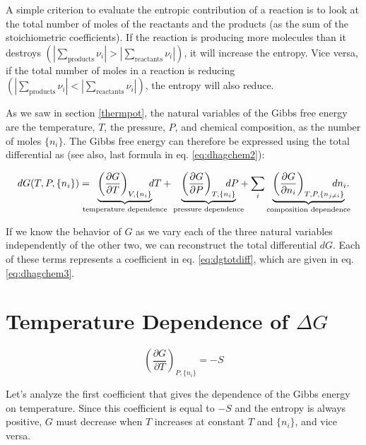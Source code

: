 \documentclass[
  9pt,
]{extbook}
\theoremstyle{definition}
\theoremstyle{definition}
\theoremstyle{definition}
\theoremstyle{remark}
\begin{document}
A simple criterion to evaluate the entropic contribution of a reaction is to look at the total number of moles of the reactants and the products (as the sum of the stoichiometric coefficients). If the reaction is producing more molecules than it destroys \(\left( \left| \sum_\text{products} \nu_i \right| > \left| \sum_\text{reactants} \nu_i \right| \right)\), it will increase the entropy. Vice versa, if the total number of moles in a reaction is reducing \(\left( \left| \sum_\text{products} \nu_i \right| < \left| \sum_\text{reactants} \nu_i \right| \right)\), the entropy will also reduce.

As we saw in section \ref{thermpot}, the natural variables of the Gibbs free energy are the temperature, \(T\), the pressure, \(P\), and chemical composition, as the number of moles \(\{n_i\}\). The Gibbs free energy can therefore be expressed using the total differential as (see also, last formula in eq. \eqref{eq:dhagchem2}):

\begin{equation}
dG(T,P,\{n_i\}) = \mkern-18mu \underbrace{\left(\frac{\partial G}{\partial T} \right)_{V,\{n_i\}}}_{\text{temperature dependence}} \mkern-36mu dT + \underbrace{\left(\frac{\partial G}{\partial P} \right)_{T,\{n_i\}}}_{\text{pressure dependence}} \mkern-36mu dP + \sum_i \underbrace{\left(\frac{\partial G}{\partial n_i} \right)_{T,P,\{n_{j \neq i}\}}}_{\text{composition dependence}} \mkern-36mu dn_i.
\label{eq:dgtotdiff}
\end{equation}

If we know the behavior of \(G\) as we vary each of the three natural variables independently of the other two, we can reconstruct the total differential \(dG\). Each of these terms represents a coefficient in eq. \eqref{eq:dgtotdiff}, which are given in eq. \eqref{eq:dhagchem3}.

\hypertarget{temperature-dependence-of-delta-g}{%
\section{\texorpdfstring{Temperature Dependence of \(\Delta G\)}{Temperature Dependence of \textbackslash Delta G}}\label{temperature-dependence-of-delta-g}}

\[
\left(\frac{\partial G}{\partial T} \right)_{P,\{n_i\}}=-S
\]

Let's analyze the first coefficient that gives the dependence of the Gibbs energy on temperature. Since this coefficient is equal to \(-S\) and the entropy is always positive, \(G\) must decrease when \(T\) increases at constant \(T\) and \(\{n_i\}\), and vice versa.
\end{document}
